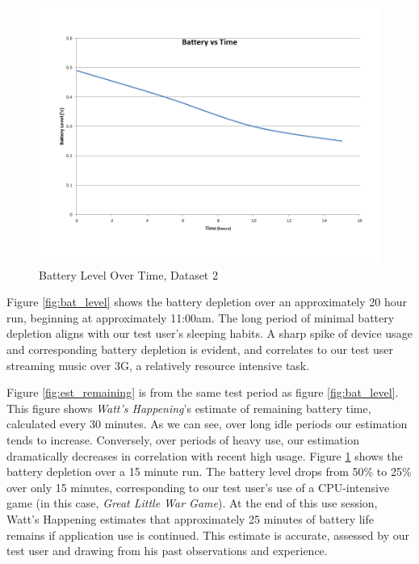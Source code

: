 \begin{figure}[h]
	\begin{center}
		\includegraphics[scale=0.5]{figs/bat_vs_time_short.png}
		\caption{Battery Level Over Time, Dataset 2}
		\label{fig:bat_vs_time_short}
\end{center}
\end{figure}
Figure \ref{fig:bat_level} shows the battery depletion over an approximately 20 hour run, beginning at approximately 11:00am. 
The long period of minimal battery depletion aligns with our test user's sleeping habits.
A sharp spike of device usage and corresponding battery depletion is evident, and correlates to our test user streaming music over 3G, a relatively resource intensive task.


Figure \ref{fig:est_remaining} is from the same test period as figure \ref{fig:bat_level}.
This figure shows \emph{Watt's Happening}'s estimate of remaining battery time, calculated every 30 minutes.
As we can see, over long idle periods our estimation tends to increase.
Conversely, over periods of heavy use, our estimation dramatically decreases in correlation with recent high usage.
Figure \ref{fig:bat_vs_time_short} shows the battery depletion over a 15 minute run.
The battery level drops from 50\% to 25\% over only 15 minutes, corresponding to our test user's use of a CPU-intensive game (in this case, \emph{Great Little War Game}\cite{glwg}).
At the end of this use session, Watt's Happening estimates that approximately 25 minutes of battery life remains if application use is continued.
This estimate is accurate, assessed by our test user and drawing from his past observations and experience.


